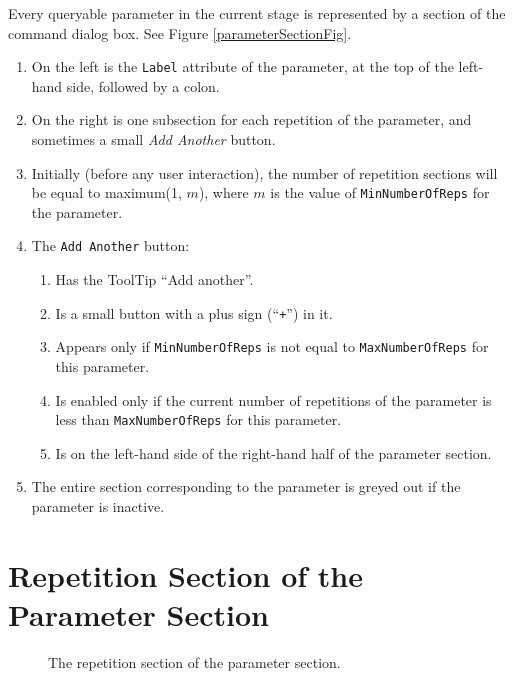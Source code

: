 \documentclass[11pt]{article}
\begin{document}
Every queryable parameter in the current stage is represented by a section
of the command dialog box.  See Figure \ref{parameterSectionFig}.
\begin{enumerate}
\item On the left is the {\tt Label} attribute of the parameter,
  at the top of the left-hand side, followed by a colon.
\item On the right is one subsection for each repetition of the parameter,
  and sometimes a small {\it Add Another} button.
\item Initially (before any user interaction), the number of repetition
  sections will be equal to maximum(1, $m$), where $m$ is the value of
 {\tt MinNumberOfReps} for the parameter.
\item The {\tt Add Another} button:
  \begin{enumerate}
  \item Has the ToolTip ``Add another''.
  \item Is a small button with a plus sign (``{\tt +}'') in it.
  \item Appears only if {\tt MinNumberOfReps} is not equal to
    {\tt MaxNumberOfReps} for this parameter.
  \item Is enabled only if the current number of repetitions of the
    parameter is less than {\tt MaxNumberOfReps} for this parameter.
  \item Is on the left-hand side of the right-hand half of the parameter
    section.
  \end{enumerate}
\item The entire section corresponding to the parameter is greyed out
  if the parameter is inactive.
\end{enumerate}

\section{Repetition Section of the Parameter Section}

\begin{figure}

\centerline{\epsfxsize=5.5in }

\caption{
  The repetition section of the parameter section.
}
\label{repetitionSectionFig}
\end{figure}
\end{document}
